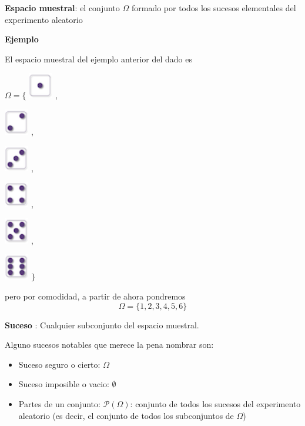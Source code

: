 \documentclass[]{book}
\providecommand{\tightlist}{%
  \setlength{\itemsep}{0pt}\setlength{\parskip}{0pt}}
\begin{document}
 \textbf{Espacio muestral}: el conjunto \(\Omega\) formado por todos los sucesos elementales del experimento aleatorio

\textbf{Ejemplo}

El espacio muestral del ejemplo anterior del dado es

\(\Omega=\Big\{\)
\includegraphics[width=0.42in]{Images/proba1dibujos/dice/1} ,

\includegraphics[width=0.42in]{Images/proba1dibujos/dice/2} ,

\includegraphics[width=0.42in]{Images/proba1dibujos/dice/3} ,

\includegraphics[width=0.42in]{Images/proba1dibujos/dice/4} ,

\includegraphics[width=0.42in]{Images/proba1dibujos/dice/5} ,

\includegraphics[width=0.42in]{Images/proba1dibujos/dice/6} \(\Big\}\)

pero por comodidad, a partir de ahora pondremos
\[\Omega = \{1,2,3,4,5,6\}\]

 \textbf{Suceso} : Cualquier subconjunto del espacio muestral.

Alguno sucesos notables que merece la pena nombrar son:

\begin{itemize}
\tightlist
\item
  Suceso seguro o cierto: \(\Omega\)
\item
  Suceso imposible o vacio: \(\emptyset\)
\item
  Partes de un conjunto: \(\mathcal{P}(\Omega)\): conjunto de todos los sucesos del experimento aleatorio (es decir, el conjunto de todos los subconjuntos de \(\Omega\))
\end{itemize}
\end{document}
